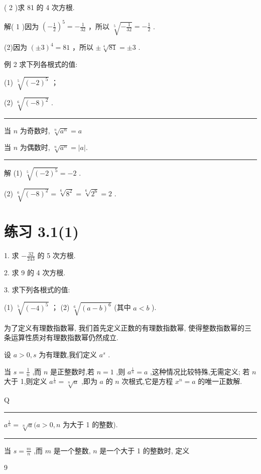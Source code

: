 \documentclass[10pt]{article}
\newcommand{\HRule}{\begin{center}\rule{0.9\linewidth}{0.2mm}\end{center}}
\begin{document}
( 2 )求 81 的 4 次方根.

解( 1 )因为 \({\left( -\frac{1}{2}\right) }^{5} =  - \frac{1}{32}\) ，所以 \(\sqrt[5]{-\frac{1}{32}} =  - \frac{1}{2}\) .

(2)因为 \({\left( \pm 3\right) }^{4} = {81}\) ，所以 \(\pm  \sqrt[4]{81} =  \pm  3\) .

例 2 求下列各根式的值:

(1) \(\sqrt[5]{{\left( -2\right) }^{5}}\) ；

(2) \(\sqrt[6]{{\left( -8\right) }^{2}}\) .

\HRule

当 \(n\) 为奇数时, \(\sqrt[n]{{a}^{n}} = a\)

当 \(n\) 为偶数时, \(\sqrt[n]{{a}^{n}} = \left| a\right| .\)

\HRule

解 (1) \(\sqrt[5]{{\left( -2\right) }^{5}} =  - 2\) .

(2) \(\sqrt[6]{{\left( -8\right) }^{2}} = \sqrt[6]{{8}^{2}} = \sqrt[6]{{2}^{6}} = 2\) .

\section*{练习 3.1(1)}

1. 求 \(- \frac{32}{243}\) 的 5 次方根.

2. 求 9 的 4 次方根.

3. 求下列各根式的值:

(1) \(\sqrt[5]{{\left( -4\right) }^{5}}\) ； (2) \(\sqrt[6]{{\left( a - b\right) }^{6}}\) (其中 \(a < b\) ).

为了定义有理数指数幂, 我们首先定义正数的有理数指数幂, 使得整数指数幂的三条运算性质对有理数指数幂仍然成立.

设 \(a > 0,s\) 为有理数,我们定义 \({a}^{s}\) .

当 \(s = \frac{1}{n}\) ,而 \(n\) 是正整数时,若 \(n = 1\) ,则 \({a}^{\frac{1}{n}} = a\) ,这种情况比较特殊,无需定义; 若 \(n\) 大于 1,则定义 \({a}^{\frac{1}{n}} = \sqrt[n]{a}\) ,即为 \(a\) 的 \(n\) 次根式,它是方程 \({x}^{n} = a\) 的唯一正数解.

Q

\HRule

\({a}^{\frac{1}{n}} = \sqrt[n]{a}(a > 0,n\) 为大于 1 的整数).

\HRule

当 \(s = \frac{m}{n}\) ,而 \(m\) 是一个整数, \(n\) 是一个大于 1 的整数时, 定义

9
\end{document}
